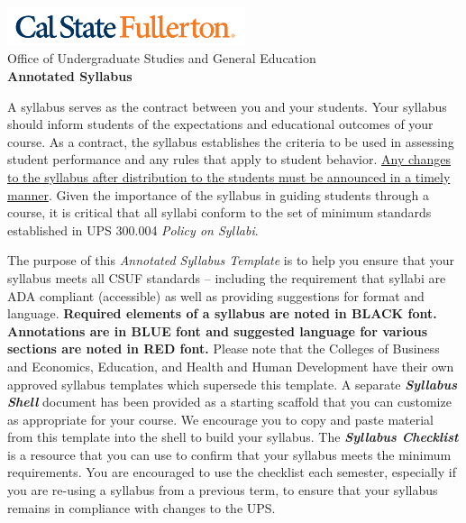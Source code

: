 \documentclass[12pt]{article}
\begin{document}
\begin{center}
\includegraphics[width=2.75in, alt={Cal State Fullerton wordmark}]{csuf_logo.png}\\
\vspace{0.5em}
{\large Office of Undergraduate Studies and General Education}\\
\vspace{1em}
{\Large \textbf{Annotated Syllabus}}
\end{center}

\vspace{1em}

A syllabus serves as the contract between you and your students. Your syllabus should inform students of the expectations and educational outcomes of your course. As a contract, the syllabus establishes the criteria to be used in assessing student performance and any rules that apply to student behavior. \uline{Any changes to the syllabus after distribution to the students must be announced in a timely manner}. Given the importance of the syllabus in guiding students through a course, it is critical that all syllabi conform to the set of minimum standards established in UPS 300.004 \emph{Policy on Syllabi}.

The purpose of this \emph{Annotated Syllabus Template} is to help you ensure that your syllabus meets all CSUF standards -- including the requirement that syllabi are ADA compliant (accessible) as well as providing suggestions for format and language. \textbf{Required elements of a syllabus are noted in BLACK font. Annotations are in BLUE font and suggested language for various sections are noted in RED font.} Please note that the Colleges of Business and Economics, Education, and Health and Human Development have their own approved syllabus templates which supersede this template. A separate \textbf{\emph{Syllabus Shell}} document has been provided as a starting scaffold that you can customize as appropriate for your course. We encourage you to copy and paste material from this template into the shell to build your syllabus. The \textbf{\emph{Syllabus Checklist}} is a resource that you can use to confirm that your syllabus meets the minimum requirements. You are encouraged to use the checklist each semester, especially if you are re-using a syllabus from a previous term, to ensure that your syllabus remains in compliance with changes to the UPS.
\end{document}
